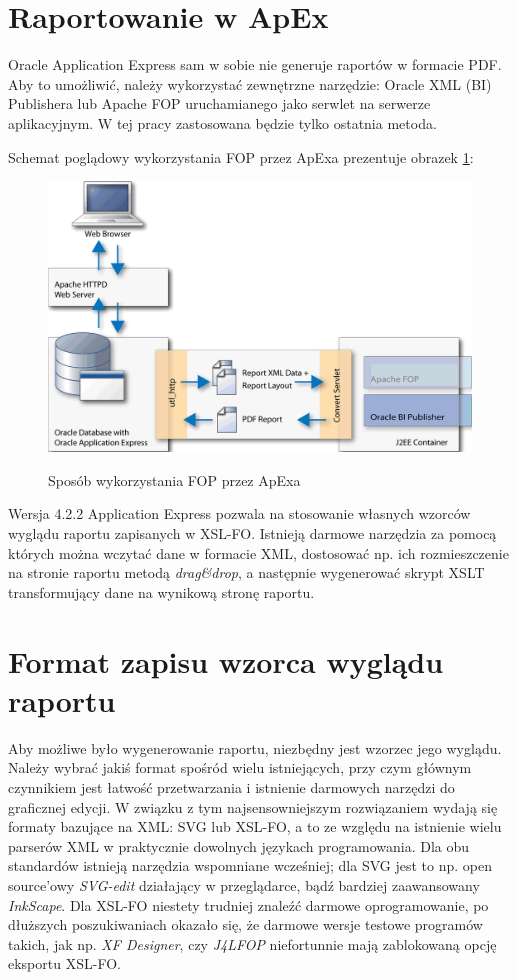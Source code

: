 \documentclass[11pt,a4paper]{article}
\begin{document}
\section{Raportowanie w ApEx}\label{sec:raporapex}
Oracle Application Express sam w sobie nie generuje raportów w formacie PDF. Aby to umożliwić, należy wykorzystać zewnętrzne narzędzie: Oracle XML (BI) Publishera lub Apache FOP uruchamianego jako serwlet na serwerze aplikacyjnym. W tej pracy zastosowana będzie tylko ostatnia metoda.

Schemat poglądowy wykorzystania FOP przez ApExa prezentuje obrazek \ref{fop:apex_usage}:\\

\begin{figure}[h]
\centering
\caption{Sposób wykorzystania FOP przez ApExa}
\includegraphics[scale=0.5]{apex_fop_usage}
\label{fop:apex_usage}
\end{figure}


Wersja 4.2.2 Application Express pozwala na stosowanie własnych wzorców wyglądu raportu zapisanych w XSL-FO. Istnieją darmowe narzędzia za pomocą których można wczytać dane w formacie XML, dostosować np. ich rozmieszczenie na stronie raportu metodą \emph{drag\&drop}, a następnie wygenerować skrypt XSLT transformujący dane na wynikową stronę raportu. 

\section{Format zapisu wzorca wyglądu raportu}\label{sec:formatywzorce}
Aby możliwe było wygenerowanie raportu, niezbędny jest wzorzec jego wyglądu. Należy wybrać jakiś format spośród wielu istniejących, przy czym głównym czynnikiem jest łatwość przetwarzania i istnienie darmowych narzędzi do graficznej edycji. W związku z tym najsensowniejszym rozwiązaniem wydają się formaty bazujące na XML: SVG lub XSL-FO, a to ze względu na istnienie wielu parserów XML w praktycznie dowolnych językach programowania. Dla obu standardów istnieją narzędzia wspomniane wcześniej; dla SVG jest to np. open source'owy \emph{SVG-edit} działający w przeglądarce, bądź bardziej zaawansowany \emph{InkScape}. Dla XSL-FO niestety trudniej znaleźć darmowe oprogramowanie, po dłuższych poszukiwaniach okazało się, że darmowe wersje testowe programów takich, jak np. \emph{XF Designer}, czy \emph{J4LFOP} niefortunnie mają zablokowaną opcję eksportu XSL-FO. 
\end{document}
